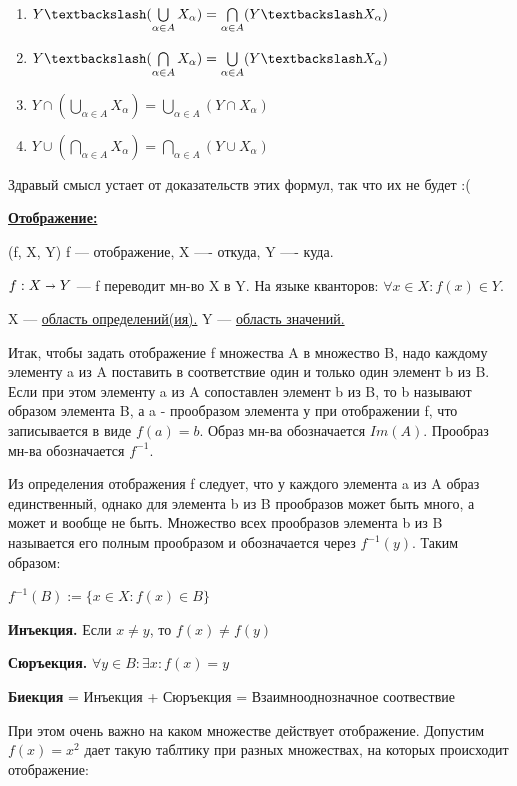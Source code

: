 \documentclass{article}
\newcommand{\deff}[1]{\underline{\textbf{#1}}}
\begin{document}
\begin{enumerate}
    \item  $ Y \textbackslash (\bigcup\limits_{\alpha \in A}X_\alpha) = \bigcap\limits_{\alpha \in A}(Y \textbackslash X_\alpha)$ 

    \item  $ Y \textbackslash (\bigcap\limits_{\alpha \in A}X_\alpha) = \bigcup\limits_{\alpha \in A}(Y \textbackslash X_\alpha)$ 

    \item $ Y \cap (\bigcup\limits_{\alpha \in A}X_\alpha) = \bigcup\limits_{\alpha \in A}(Y \cap X_\alpha)$ 
    
     \item $ Y \cup (\bigcap\limits_{\alpha \in A}X_\alpha) = \bigcap\limits_{\alpha \in A}(Y \cup X_\alpha)$ 
\end{enumerate}
Здравый смысл устает от доказательств этих формул, так что их не будет :(

\deff{Отображение:}

(f, X, Y) f --- отображение, X ---- откуда, Y ---- куда.

$f: X \shortrightarrow Y$ --- f переводит мн-во  X в Y. На языке кванторов: $\forall x \in X: f(x) \in Y$.

X --- \uline{область определений(ия).} Y --- \uline{область значений.}

Итак, чтобы задать отображение f множества A в множество B, надо каждому элементу a из A поставить в соответствие один и только один элемент b из B. Если при этом элементу a из A сопоставлен элемент b из B, то b называют образом элемента B, а a - прообразом элемента у при отображении f, что записывается в виде $f(a)=b$. Образ мн-ва обозначается $Im(A)$. Прообраз мн-ва  обозначается $f^{-1}$.

Из определения отображения f следует, что у каждого элемента a из A образ единственный, однако для элемента b из B прообразов может быть много, а может и вообще не быть. Множество всех прообразов элемента b из B называется его полным прообразом и обозначается через $f^{-1}(y)$. Таким образом:


$f^{-1}(B):= \{x \in X: f(x) \in B\}$

\textbf{Инъекция.} Если $x \neq y$, то $f(x) \neq f(y)$

\textbf{Сюръекция.} $\forall y \in B: \exists x: f(x)=y$

\textbf{Биекция} = Инъекция + Сюръекция = Взаимнооднозначное соотвествие

При этом очень важно на каком множестве действует отображение. Допустим $f(x)=x^2$ дает такую таблтику при разных множествах, на которых происходит отображение:
\end{document}
